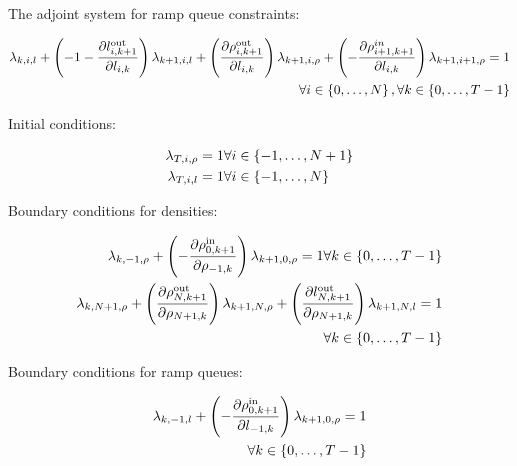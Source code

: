 The adjoint system for ramp queue constraints:

\begin{align*}
\lambda_{k,i,l}+\left(-1-\frac{\partial l_{i,k+1}^{\text{out}}}{\partial l_{i,k}}\right)\lambda_{k+1,i,l}+\left(\frac{\partial\rho_{i,k+1}^{\text{out}}}{\partial l_{i,k}}\right)\lambda_{k+1,i,\rho}+\left(-\frac{\partial\rho_{i+1,k+1}^{in}}{\partial l_{i,k}}\right)\lambda_{k+1,i+1,\rho}=1\\
\forall i\in\left\{ 0,\ldots,N\right\} ,\forall k\in\left\{ 0,\ldots,T-1\right\} 
\end{align*}


Initial conditions:

\begin{align*}
\lambda_{T,i,\rho}=1 & \forall i\in\left\{ -1,\ldots,N+1\right\} \\
\lambda_{T,i,l}=1 & \forall i\in\left\{ -1,\ldots,N\right\} 
\end{align*}


Boundary conditions for densities:

\begin{align*}
\lambda_{k,-1,\rho}+\left(-\frac{\partial\rho_{0,k+1}^{\text{in}}}{\partial\rho_{-1,k}}\right)\lambda_{k+1,0,\rho}=1\forall k\in\left\{ 0,\ldots,T-1\right\} \\
\lambda_{k,N+1,\rho}+\left(\frac{\partial\rho_{N,k+1}^{\text{out}}}{\partial\rho_{N+1,k}}\right)\lambda_{k+1,N,\rho}+\left(\frac{\partial l_{N,k+1}^{\text{out}}}{\partial\rho_{N+1,k}}\right)\lambda_{k+1,N,l}=1\\
\forall k\in\left\{ 0,\ldots,T-1\right\} 
\end{align*}


Boundary conditions for ramp queues:

\begin{align*}
\lambda_{k,-1,l}+\left(-\frac{\partial\rho_{0,k+1}^{\text{in}}}{\partial l_{-1,k}}\right)\lambda_{k+1,0,\rho}=1\\
\forall k\in\left\{ 0,\ldots,T-1\right\} 
\end{align*}
